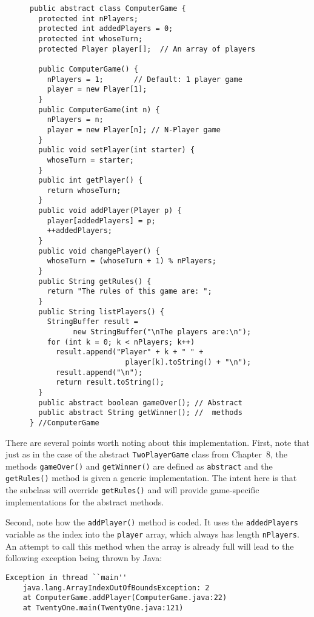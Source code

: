 \begin{figure}[h!]
\scriptsize
\jjjprogstart
\begin{jjjlisting}
\begin{lstlisting}
public abstract class ComputerGame {   
  protected int nPlayers;
  protected int addedPlayers = 0;
  protected int whoseTurn;
  protected Player player[];  // An array of players

  public ComputerGame() {
    nPlayers = 1;       // Default: 1 player game
    player = new Player[1];
  }
  public ComputerGame(int n) {
    nPlayers = n;
    player = new Player[n]; // N-Player game
  }
  public void setPlayer(int starter) { 
    whoseTurn = starter; 
  }
  public int getPlayer() { 
    return whoseTurn;  
  }
  public void addPlayer(Player p) {
    player[addedPlayers] = p;
    ++addedPlayers;
  }
  public void changePlayer() { 
    whoseTurn = (whoseTurn + 1) % nPlayers;
  }
  public String getRules() {
    return "The rules of this game are: ";
  }
  public String listPlayers() {
    StringBuffer result = 
          new StringBuffer("\nThe players are:\n");
    for (int k = 0; k < nPlayers; k++)
      result.append("Player" + k + " " + 
                      player[k].toString() + "\n");
      result.append("\n");
      return result.toString();
  }
  public abstract boolean gameOver(); // Abstract
  public abstract String getWinner(); //  methods
} //ComputerGame
\end{lstlisting}
\end{jjjlisting}
\end{figure}

\noindent There are several points worth noting about this
implementation. First, note that just as in the case of the abstract
{\tt TwoPlayerGame} class from Chapter~8, the methods {\tt gameOver()}
and {\tt getWinner()} are defined as {\tt abstract} and the {\tt
getRules()} method is given a generic implementation. The intent here
is that the subclass will override {\tt getRules()} and will provide
game-specific implementations for the abstract methods.

Second, note how the {\tt addPlayer()} method is coded. It uses the
{\tt addedPlayers} variable as the index into the {\tt player} array,
which always has length {\tt nPlayers}.  An attempt to call this
method when the array is already full will lead to the following
exception being thrown by Java:

\begin{jjjlisting}
\begin{lstlisting}
Exception in thread ``main'' 
    java.lang.ArrayIndexOutOfBoundsException: 2
    at ComputerGame.addPlayer(ComputerGame.java:22)
    at TwentyOne.main(TwentyOne.java:121)
\end{lstlisting}
\end{jjjlisting}

